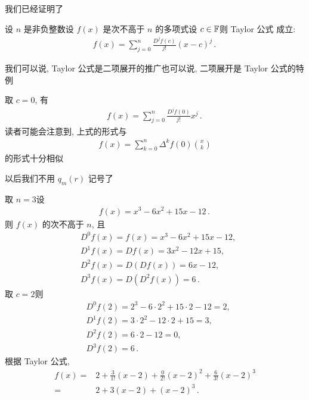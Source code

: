 我们已经证明了

\begin{proposition}
    设 $n$ 是非负整数\period 设 $f(x)$ 是次不高于 $n$ 的多项式\period 设 $c \in \mathbb{F}$\period 则 Taylor 公式  成立:
    \begin{align*}
        f(x) = \sum_{j = 0}^{n} \frac{D^j f(c)}{j!} (x-c)^j \period
    \end{align*}
\end{proposition}

\begin{remark}
    我们可以说, Taylor 公式是二项展开的推广\period 也可以说, 二项展开是 Taylor 公式的特例\period
\end{remark}

\begin{remark}
    取 $c = 0$, 有
    \begin{align*}
        f(x) = \sum_{j = 0}^{n} \frac{D^j f(0)}{j!} x^j \period
    \end{align*}
    读者可能会注意到, 上式的形式与
    \begin{align*}
        f(x) = \sum_{k = 0}^{n} \Delta^k f(0) \binom{x}{k}
    \end{align*}
    的形式十分相似\period
\end{remark}

\begin{remark}
    以后我们不用 $q_m (r)$ 记号了\period
\end{remark}

\begin{example}
    取 $n = 3$\period 设
    \begin{align*}
        f(x) = x^3 - 6x^2 + 15x - 12 \period
    \end{align*}
    则 $f(x)$ 的次不高于 $n$, 且
    \begin{align*}
         & D^0 f(x) = f(x) = x^3 - 6x^2 + 15x - 12, \\
         & D^1 f(x) = D f(x) = 3x^2 - 12x + 15,     \\
         & D^2 f(x) = D (D f(x)) = 6x - 12,         \\
         & D^3 f(x) = D (D^2 f(x)) = 6 \period
    \end{align*}
    取 $c = 2$\period 则
    \begin{align*}
         & D^0 f(2) = 2^3 - 6 \cdot 2^2 + 15 \cdot 2 - 12 = 2, \\
         & D^1 f(2) = 3 \cdot 2^2 - 12 \cdot 2 + 15 = 3,       \\
         & D^2 f(2) = 6 \cdot 2 - 12 = 0,                      \\
         & D^3 f(2) = 6 \period
    \end{align*}
    根据 Taylor 公式,
    \begin{align*}
        f(x)
        = {} & 2 + \frac{3}{1!} (x-2) + \frac{0}{2!} (x-2)^2 + \frac{6}{3!} (x-2)^3 \\
        = {} & 2 + 3(x-2) + (x-2)^3 \period
    \end{align*}
\end{example}

